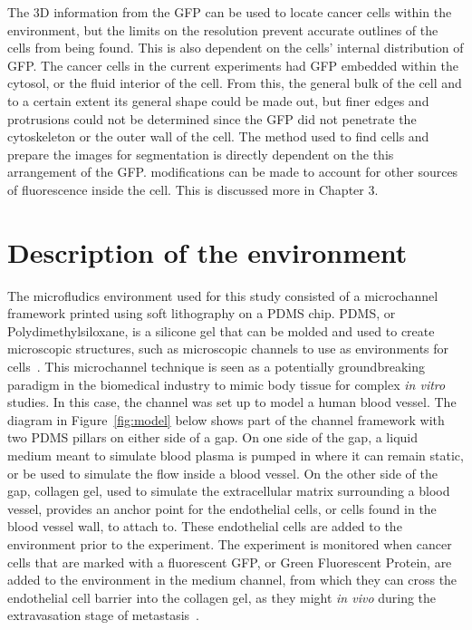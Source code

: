 The 3D information from the GFP can be used to locate cancer cells within the environment, but the limits on the resolution prevent accurate outlines of the cells from being found. This is also dependent on the cells' internal distribution of GFP. The cancer cells in the current experiments had GFP embedded within the cytosol, or the fluid interior of the cell. From this, the general bulk of the cell and to a certain extent its general shape could be made out, but finer edges and protrusions could not be determined since the GFP did not penetrate the cytoskeleton or the outer wall of the cell. The method used to find cells and prepare the images for segmentation is directly dependent on the this arrangement of the GFP. modifications can be made to account for other sources of fluorescence inside the cell. This is discussed more in Chapter 3.

\section{Description of the environment}

The microfludics environment used for this study consisted of a microchannel framework printed using soft lithography on a PDMS chip. PDMS, or Polydimethylsiloxane, is a silicone gel that can be molded and used to create microscopic structures, such as microscopic channels to use as environments for cells~\cite{Zheng:10}\cite{Herold:09}\cite{Halldorsson:15}. This microchannel technique is seen as a potentially groundbreaking paradigm in the biomedical industry to mimic body tissue for complex \emph{in vitro} studies. In this case, the channel was set up to model a human blood vessel. The diagram in Figure~\ref{fig:model} below shows part of the channel framework with two PDMS pillars on either side of a gap. On one side of the gap, a liquid medium meant to simulate blood plasma is pumped in where it can remain static, or be used to simulate the flow inside a blood vessel. On the other side of the gap, collagen gel, used to simulate the extracellular matrix surrounding a blood vessel, provides an anchor point for the endothelial cells, or cells found in the blood vessel wall, to attach to. These endothelial cells are added to the environment prior to the experiment. The experiment is monitored when cancer cells that are marked with a fluorescent GFP, or Green Fluorescent Protein, are added to the environment in the medium channel, from which they can cross the endothelial cell barrier into the collagen gel, as they might \emph{in vivo} during the extravasation stage of metastasis~\cite{Reymond:13}.

